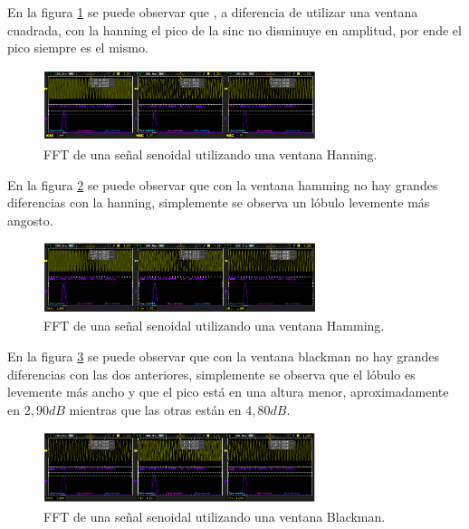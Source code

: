 \documentclass[a4paper,10pt]{article}
\begin{document}
	\indent En la figura \ref{img002} se puede observar que , a diferencia
	de utilizar una ventana cuadrada, con la hanning el pico de la sinc no 
	disminuye en amplitud, por ende el pico siempre es el mismo.

	\begin{figure}[!htb]
		\centering
		\includegraphics[width=8cm]
		{Imagenes/HanningWindow.png}
		\caption{FFT de una señal senoidal utilizando una ventana Hanning.}
		\label{img002}
	\end{figure}

	\indent En la figura \ref{img003} se puede observar que con la ventana 
	hamming no hay grandes diferencias con la hanning, simplemente se observa 
	un lóbulo levemente más angosto.

	\begin{figure}[!htb]
		\centering
		\includegraphics[width=8cm]
		{Imagenes/HammingWindow.png}
		\caption{FFT de una señal senoidal utilizando una ventana Hamming.}
		\label{img003}
	\end{figure}

	\indent En la figura \ref{img004} se puede observar que con la ventana 
	blackman no hay grandes diferencias con las dos anteriores, simplemente se 
	observa que el lóbulo es levemente más ancho y que el pico está en una 
	altura menor, aproximadamente en $2,90dB$ mientras que las otras están en 
	$4,80dB$.

	\begin{figure}[!htb]
		\centering
		\includegraphics[width=8cm]
		{Imagenes/BlackmanWindow.png}
		\caption{FFT de una señal senoidal utilizando una ventana Blackman.}
		\label{img004}
	\end{figure}
\end{document}

